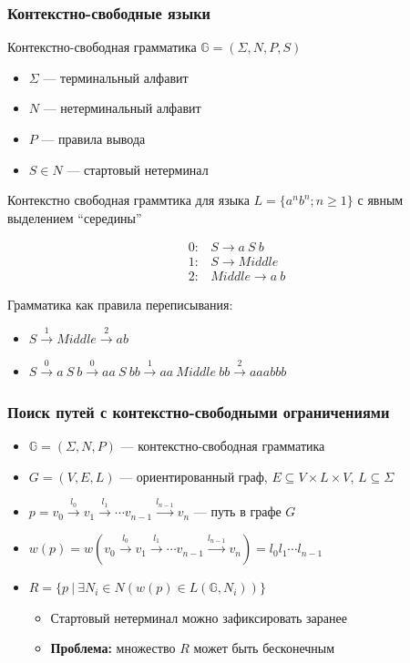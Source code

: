 \documentclass[xcolor=table,aspectratio=169]{beamer}
\begin{document}
\begin{frame}[fragile]
  \transwipe[direction=90]
  \frametitle{Контекстно-свободные языки}
Контекстно-свободная грамматика $\mathbb{G}=(\Sigma,N,P,S)$ 
  \begin{itemize}
      \item $\Sigma$ --- терминальный алфавит
      \item $N$ --- нетерминальный алфавит
      \item $P$ --- правила вывода
      \item $S \in N$ --- стартовый нетерминал
  \end{itemize}

Контекстно свободная граммтика для языка $L=\{a^n b^n; n \geq 1\}$ с явным выделением ``середины'' \\
\begin{center}
   \[
\begin{array}{rl} 
   0:& S \rightarrow a \ S \ b \\
   1:& S \rightarrow Middle \\
   2:& Middle \rightarrow a \ b
\end{array}
\]
\end{center}

Грамматика как правила переписывания:
 
    \begin{itemize}
        \item $S \xrightarrow{1} Middle \xrightarrow{2} ab$
        \item $S \xrightarrow{0} a\ S\ b \xrightarrow{0} aa\ S\ bb \xrightarrow{1} aa\ Middle\ bb \xrightarrow{2} aaabbb$
    \end{itemize}

\end{frame}

\begin{frame}[fragile]
  \transwipe[direction=90]
  \frametitle{Поиск путей с контекстно-свободными ограничениями}
  \begin{itemize}
  \item $\mathbb{G} = (\Sigma, N, P)$ --- контекстно-свободная грамматика
  \item $G = (V,E,L)$ --- ориентированный граф, $E \subseteq V\times L \times V$, $L\subseteq \Sigma$
  \item $p = v_0 \xrightarrow{l_0} v_1 \xrightarrow{l_1} \cdots v_{n-1}\xrightarrow{l_{n-1}}v_n$ --- путь в графе $G$
  \item $w(p) = w(v_0 \xrightarrow{l_0} v_1 \xrightarrow{l_1} \cdots v_{n-1}\xrightarrow{l_{n-1}}v_n) = l_0 l_1 \cdots l_{n-1}$
  \item $R =\{ p \ | \ \exists N_i \in N (w(p) \in L(\mathbb{G},N_i))\}$
  \begin{itemize}
    \item Стартовый нетерминал можно зафиксировать заранее
    \item \textbf{Проблема:} множество $R$ может быть бесконечным
  \end{itemize}
  \end{itemize}
\end{frame}
\end{document}
